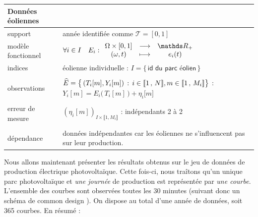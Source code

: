 \noindent\begin{tabularx}{\textwidth}{XX}
	\toprule
	\textbf{Données éoliennes}                                                                                                                                                                              \\
	\midrule
	support            & année identifiée comme $\mathcal T = [0,1]$                                                                                                                                        \\
	modèle fonctionnel & $\forall i \in I \quad E_i : \func {\Omega \times [0,1]} {\mathds R_+} {(\omega, t)} {e_i(t)}$                                                                                     \\
	indices            & éolienne individuelle : $I = \bigl\{ \, \textsf{id du parc éolien} \,\bigr\}$                                                                                                      \\
	\\
	observations       & $\widehat E = \bigl\{ \, (T_i[m], Y_i[m]) \, : \, i \in \llbracket 1 \, , \, N \rrbracket, m \in \llbracket 1 \, , \, M_i \rrbracket \bigr\}$ : $Y_i[m] = E_i\bigl( \, T_i[m] \, \bigr) + \eta_i\bigl[ m \bigr]$ \\
	\\
	erreur de mesure   & $(\eta_i[m])_{I\times\llbracket 1, M_i \rrbracket}$ : indépendants 2 à 2                                                                                                           \\
	\\
	dépendance         & données indépendantes car les éoliennes ne s'influencent pas sur leur production.                                                                                                  \\
	\bottomrule
\end{tabularx}

\bigskip

Nous allons maintenant présenter les résultats obtenus sur le jeu de données de production électrique photovoltaïque. Cette fois-ci, nous traîtons qu'un unique parc photovoltaïque et \emph{une journée} de production est représentée par \emph{une courbe}. L'ensemble des courbes sont observées toutes les 30 minutes (suivant donc un schéma de \og common design \fg). On dispose au total d'une année de données, soit 365 courbes. En résumé :

\bigskip

